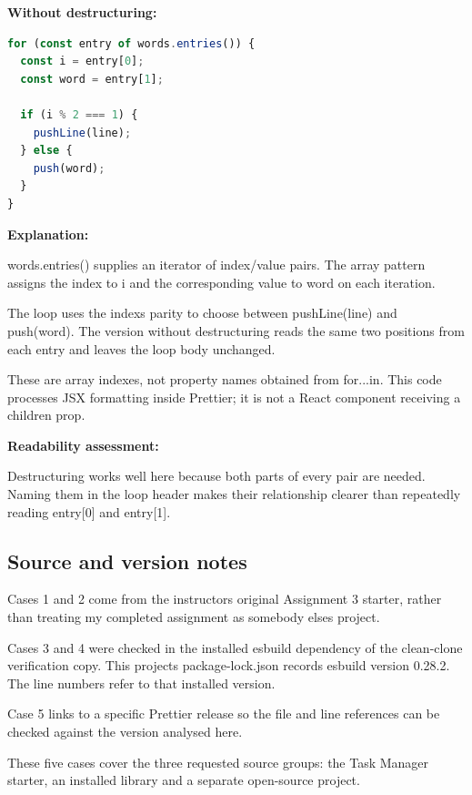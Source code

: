 \documentclass[
  10pt,
  a4paper,
  titlepage]{article}
\begin{document}

\textbf{Without destructuring:}

\Needspace{82.4pt}
\begin{lstlisting}[language=JavaScript]
for (const entry of words.entries()) {
  const i = entry[0];
  const word = entry[1];

  if (i % 2 === 1) {
    pushLine(line);
  } else {
    push(word);
  }
}
\end{lstlisting}


\textbf{Explanation:}

words.entries() supplies an iterator of index/value pairs. The array
pattern assigns the index to i and the corresponding value to word on
each iteration.

The loop uses the index\textquotesingle s parity to choose between
pushLine(line) and push(word). The version without destructuring reads
the same two positions from each entry and leaves the loop body
unchanged.

These are array indexes, not property names obtained from for...in. This
code processes JSX formatting inside Prettier; it is not a React
component receiving a children prop.

\textbf{Readability assessment:}

Destructuring works well here because both parts of every pair are
needed. Naming them in the loop header makes their relationship clearer
than repeatedly reading entry{[}0{]} and entry{[}1{]}.

\subsection{Source and version notes}\label{source-and-version-notes}

Cases 1 and 2 come from the instructor\textquotesingle s original
Assignment 3 starter, rather than treating my completed assignment as
somebody else\textquotesingle s project.

Cases 3 and 4 were checked in the installed esbuild dependency of the
clean-clone verification copy. This project\textquotesingle s
package-lock.json records esbuild version 0.28.2. The line numbers refer
to that installed version.

Case 5 links to a specific Prettier release so the file and line
references can be checked against the version analysed here.

These five cases cover the three requested source groups: the Task
Manager starter, an installed library and a separate open-source
project.
\end{document}
